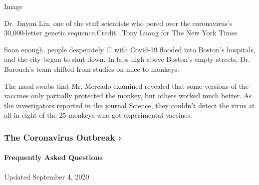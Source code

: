 Image

Dr. Jinyan Liu, one of the staff scientists who pored over the
coronavirus's 30,000-letter genetic sequence.Credit...Tony Luong for The
New York Times

Soon enough, people desperately ill with Covid-19 flooded into Boston's
hospitals, and the city began to shut down. In labs high above Boston's
empty streets, Dr. Barouch's team shifted from studies on mice to
monkeys.

The nasal swabs that Mr. Mercado examined revealed that some versions of
the vaccines only partially protected the monkey, but others worked much
better. As the investigators reported in the journal Science, they
couldn't detect the virus at all in eight of the 25 monkeys who got
experimental vaccines.

\href{https://www.nytimes3xbfgragh.onion/news-event/coronavirus?action=click\&pgtype=Article\&state=default\&region=MAIN_CONTENT_3\&context=storylines_faq}{}

\hypertarget{the-coronavirus-outbreak-}{%
\subsubsection{The Coronavirus Outbreak
›}\label{the-coronavirus-outbreak-}}

\hypertarget{frequently-asked-questions}{%
\paragraph{Frequently Asked
Questions}\label{frequently-asked-questions}}

Updated September 4, 2020


